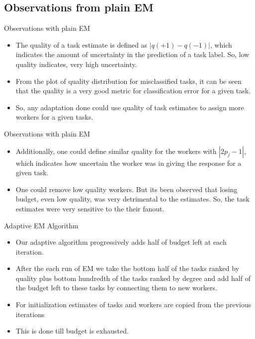 \documentclass{beamer}
\begin{document}
\subsection{Observations from plain EM}

\begin{frame}{Observations with plain EM}
    \begin{itemize}
    \item {
    The quality of a task estimate is defined as $|q(+1) - q(-1)|$, which indicates the amount of uncertainty in the prediction of a task label. So, low quality indicates, very high uncertainty.
    }
    \item {
    From the plot of quality distribution for misclassified tasks, it can be seen that the quality is a very good metric for classification error for a given task.
    }
    \item {
    So, any adaptation done could use quality of task estimates to assign more workers for a given tasks.
    }
    \end{itemize}
\end{frame}


\begin{frame}{Observations with plain EM}
    \begin{itemize}
    \item {
    Additionally, one could define similar quality for the workers with $|2p_j-1|$, which indicates how uncertain the worker was in giving the response for a given task.
    }
    \item {
    One could remove low quality workers. But its been observed that losing budget, even low quality, was very detrimental to the estimates. So, the task estimates were very sensitive to the their fanout.
    }
    \end{itemize}
\end{frame}




\begin{frame}{Adaptive EM Algorithm}
    \begin{itemize}
    \item{
    Our adaptive algorithm progressively adds half of budget left at each iteration.
    }
    \item{
    After the each run of EM we take the bottom half of the tasks ranked by quality plus bottom hundredth of the tasks ranked by degree and add half of the budget left to these tasks by connecting them to new workers.}
    \item{
    For initialization estimates of tasks and workers are copied from the previous iterations}
    \item{
    This is done till budget is exhausted.}
    \end{itemize}
\end{frame}
\end{document}
